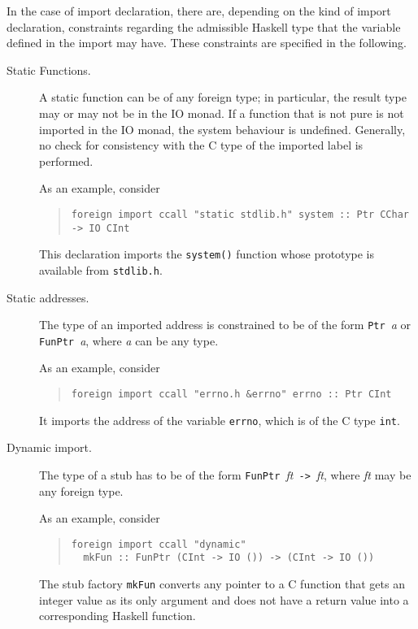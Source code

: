 \documentclass[a4paper,twoside]{article}
\newcommand{\code}[1]{\texttt{#1}}      %
\begin{document}
In the case of import declaration, there are, depending on the kind of import
declaration, constraints regarding the admissible Haskell type that the
variable defined in the import may have.  These constraints are specified in
the following.
%
\begin{description}
\item[Static Functions.]  A static function can be of any foreign type; in
  particular, the result type may or may not be in the IO monad.  If a
  function that is not pure is not imported in the IO monad, the system
  behaviour is undefined.  Generally, no check for consistency with the C type
  of the imported label is performed.

  As an example, consider
  \begin{quote}
\begin{verbatim}
foreign import ccall "static stdlib.h" system :: Ptr CChar -> IO CInt
\end{verbatim}
  \end{quote}
  This declaration imports the \code{system()} function whose prototype is
  available from \code{stdlib.h}.

\item[Static addresses.]  The type of an imported address is constrained to be
  of the form \code{Ptr }\textit{a} or \code{FunPtr }\textit{a}, where
  \textit{a} can be any type.

  As an example, consider
  \begin{quote}
\begin{verbatim}
foreign import ccall "errno.h &errno" errno :: Ptr CInt
\end{verbatim}
  \end{quote}
  It imports the address of the variable \code{errno}, which is of the C type
  \code{int}.

\item[Dynamic import.]  The type of a  stub has to be of the
  form \code{FunPtr }\textit{ft}\code{ -> }\textit{ft}, where \textit{ft} may
  be any foreign type.

  As an example, consider
  \begin{quote}
\begin{verbatim}
foreign import ccall "dynamic" 
  mkFun :: FunPtr (CInt -> IO ()) -> (CInt -> IO ())
\end{verbatim}
  \end{quote}
  The stub factory \code{mkFun} converts any pointer to a C function that gets
  an integer value as its only argument and does not have a return value into
  a corresponding Haskell function.


\end{description}
\end{document}
